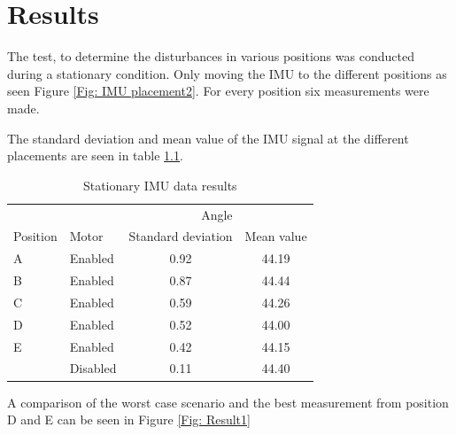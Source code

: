 \documentclass[a4paper,11pt]{kth-mag}
\begin{document}
\chapter{Results}
The test, to determine the disturbances in various positions was conducted during a stationary condition. Only moving the IMU to the different positions as seen Figure \ref{Fig: IMU placement2}. For every position six measurements were made.

The standard deviation and mean value of the IMU signal at the different placements are seen in table \ref{Table: Standard deviation}.

\begin{table} [!hbt]
\centering
\begin{tabular}{@{}llcc@{}} \toprule
\multicolumn{3}{r}{Angle} \\ \cmidrule(r){3-4}
Position & Motor & Standard deviation & Mean value\\ \midrule
A  	 & Enabled 	& 0.92 & 44.19 \\
B    & Enabled 	& 0.87 & 44.44 \\
C  	 & Enabled 	& 0.59 & 44.26\\
D   	 & Enabled 	& 0.52 & 44.00\\
E	 & Enabled 	& 0.42 & 44.15\\
	 & Disabled	& 0.11 & 44.40\\ \bottomrule
 \end{tabular}
 \caption{Stationary IMU data results}
  \label{Table: Standard deviation}
\end{table}

A comparison of the worst case scenario and the best measurement from position D and E can be seen in Figure \ref{Fig: Result1}
\end{document}
